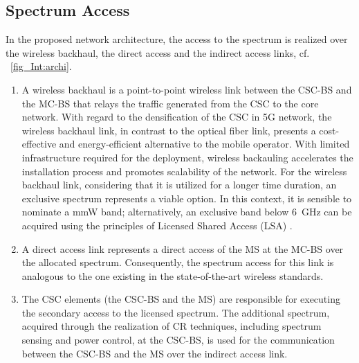 \subsection{Spectrum Access}
In the proposed network architecture, the access to the spectrum is realized over the wireless backhaul, the direct access and the indirect access links, cf. \figurename~\ref{fig_Int:archi}.
\begin{enumerate}
\item A wireless backhaul is a
point-to-point wireless link between the CSC-BS and the MC-BS that relays the traffic generated from the CSC to the core network. With regard to the densification of the CSC in 5G network, the wireless backhaul link, in contrast to the optical fiber link, presents a cost-effective and energy-efficient alternative to the mobile operator.
With limited infrastructure required for the deployment, wireless backauling accelerates the installation process and promotes scalability of the network.
For the wireless backhaul link, considering that it is utilized for a longer time duration, an exclusive spectrum represents a viable option. In this context, it is sensible to nominate a mmW band; alternatively, an exclusive band below \SI{6}{GHz} can be acquired using the principles of Licensed Shared Access (LSA) \cite{ETSI13}.

\item A direct access link represents a direct access of the MS at the MC-BS over the allocated spectrum. Consequently, the spectrum access for this link is analogous to the one existing in the state-of-the-art wireless standards.
\item The CSC elements (the CSC-BS and the MS) are responsible for executing the secondary access to the licensed spectrum. The additional spectrum, acquired through the realization of CR techniques, including spectrum sensing and power control, at the CSC-BS, is used for the communication between the CSC-BS and the MS over the indirect access link.
\end{enumerate}

